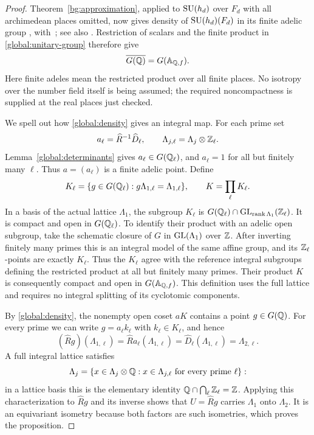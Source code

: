 \begin{proof}
Theorem~\ref{bg:approximation}, applied to $\operatorname{SU}(h_d)$ over $F_d$
with all archimedean places omitted, now gives density of
$\operatorname{SU}(h_d)(F_d)$ in its finite adelic group
\cite[Theorem~A]{Platonov1969}, with~\cite{Platonov1970}; see also
\cite[Theorem~2.3]{Rapinchuk2014}.
Restriction of scalars and the finite product in
\eqref{global:unitary-group} therefore give
\begin{equation}
\label{global:density}
 \overline{G(\mathbb Q)}=G(\mathbb A_{\mathbb Q,f}).
\end{equation}
Here finite adeles mean the restricted product over all finite
places.  No isotropy over the number field itself is being
assumed; the required noncompactness is supplied at the real
places just checked.

We spell out how \eqref{global:density} gives an integral map.
For each prime set
\[
 a_\ell=\widehat R^{-1}\widehat D_\ell,
 \qquad \Lambda_{j,\ell}=\Lambda_j\otimes\mathbb Z_\ell.
\]
Lemma~\ref{global:determinants} gives $a_\ell\in G(\mathbb Q_\ell)$,
and $a_\ell=1$ for all but finitely many $\ell$.  Thus
$a=(a_\ell)$ is a finite adelic point.  Define
\[
 K_\ell=\{g\in G(\mathbb Q_\ell):g\Lambda_{1,\ell}
                   =\Lambda_{1,\ell}\},
 \qquad K=\prod_\ell K_\ell.
\]
In a basis of the actual lattice $\Lambda_1$, the subgroup
$K_\ell$ is $G(\mathbb Q_\ell)\cap\operatorname{GL}_{\operatorname{rank}\Lambda_1}(\mathbb Z_\ell)$.
It is compact and open in $G(\mathbb Q_\ell)$. To identify their product with
an adelic open subgroup, take the schematic closure of $G$ in
$\operatorname{GL}(\Lambda_1)$ over $\mathbb Z$. After inverting finitely many primes this
is an integral model of the same affine group, and its
$\mathbb Z_\ell$-points are exactly $K_\ell$. Thus the $K_\ell$ agree with
the reference integral subgroups defining the restricted product at
all but finitely many primes. Their product $K$ is consequently compact
and open in $G(\mathbb A_{\mathbb Q,f})$.  This definition uses the full lattice and
requires no integral splitting of its cyclotomic components.

By \eqref{global:density}, the nonempty open coset $aK$ contains
a point $g\in G(\mathbb Q)$.  For every prime we can write
$g=a_\ell k_\ell$ with $k_\ell\in K_\ell$, and hence
\[
 (\widehat Rg)(\Lambda_{1,\ell})
 =\widehat R a_\ell(\Lambda_{1,\ell})
 =\widehat D_\ell(\Lambda_{1,\ell})
 =\Lambda_{2,\ell}.
\]
A full integral lattice satisfies
\[
 \Lambda_j
 =\{x\in\Lambda_j\otimes\mathbb Q:
                x\in\Lambda_{j,\ell}\text{ for every prime }\ell\}:
\]
in a lattice basis this is the elementary identity
$\mathbb Q\cap\bigcap_\ell\mathbb Z_\ell=\mathbb Z$.
Applying this characterization to $\widehat Rg$ and its inverse
shows that $U=\widehat Rg$ carries $\Lambda_1$ onto $\Lambda_2$.
It is an equivariant isometry because both factors are such
isometries, which proves the proposition.
\end{proof}

